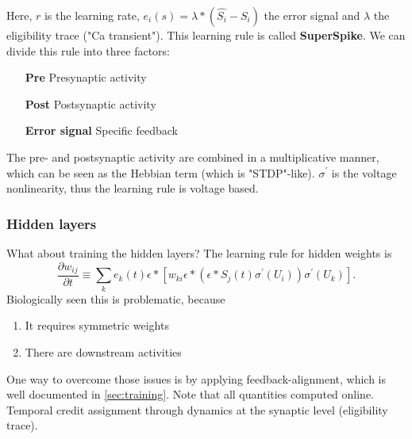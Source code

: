 \documentclass[main]{subfiles}
\begin{document}
%
Here, $r$ is the learning rate, $e_{i}(s)=\lambda*(\hat{S_i}-S_i)$ the error signal and $\lambda$ the eligibility trace ("Ca transient"). This learning rule is called \textbf{SuperSpike}. We can divide this rule into three factors:
%
\begin{itemize}
    \item[\textbf{Pre}] Presynaptic activity
    \item[\textbf{Post}] Postsynaptic activity
    \item[\textbf{Error signal}] Specific feedback
\end{itemize}
%
The pre- and postsynaptic activity are combined in a multiplicative manner, which can be seen as the Hebbian term (which is "STDP"-like). $\sigma^'$ is the voltage nonlinearity, thus the learning rule is voltage based. 

\subsubsection{Hidden layers}
What about training the hidden layers? The learning rule for hidden weights is 
%
\begin{equation}
\frac{\partial w_{i j}}{\partial t} \equiv \sum_{k} e_{k}(t) \epsilon *\left[w_{k i} \epsilon *\left(\epsilon * S_{j}(t) \sigma^{\prime}\left(U_{i}\right)\right) \sigma^{\prime}\left(U_{k}\right)\right].
\end{equation}
%
Biologically seen this is problematic, because
\begin{enumerate}
    \item It requires symmetric weights
    \item There are downstream activities
\end{enumerate}
One way to overcome those issues is by applying feedback-alignment, which is well documented in \cref{sec:training}. Note that all quantities computed online. Temporal credit assignment through dynamics at the synaptic level (eligibility trace).
\end{document}

